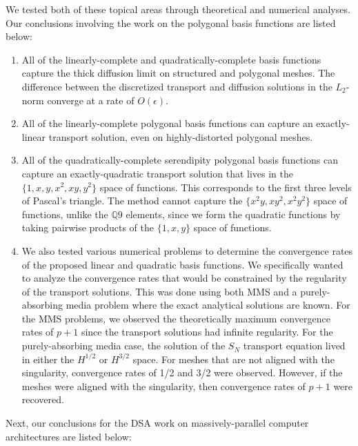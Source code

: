 We tested both of these topical areas through theoretical and numerical analyses. Our conclusions involving the work on the polygonal basis functions are listed below:

\begin{enumerate}
\item All of the linearly-complete and quadratically-complete basis functions capture the thick diffusion limit on structured and polygonal meshes. The difference between the discretized transport and diffusion solutions in the $L_2$-norm converge at a rate of $O(\epsilon)$.
\item All of the linearly-complete polygonal basis functions can capture an exactly-linear transport solution, even on highly-distorted polygonal meshes.
\item All of the quadratically-complete serendipity polygonal basis functions can capture an exactly-quadratic transport solution that lives in the $\{ 1,x,y,x^2,xy,y^2\}$ space of functions. This corresponds to the first three levels of Pascal's triangle. The method cannot capture the $\{ x^2y,xy^2,x^2y^2\}$ space of functions, unlike the $\mathbb{Q}9$ elements, since we form the quadratic functions by taking pairwise products of the $\{ 1,x,y\}$ space of functions.
\item We also tested various numerical problems to determine the convergence rates of the proposed linear and quadratic basis functions. We specifically wanted to analyze the convergence rates that would be constrained by the regularity of the transport solutions. This was done using both MMS and a purely-absorbing media problem where the exact analytical solutions are known. For the MMS problems, we observed the theoretically maximum convergence rates of $p+1$ since the transport solutions had infinite regularity. For the purely-absorbing media case, the solution of the $S_N$ transport equation lived in either the $H^{1/2}$ or $H^{3/2}$ space. For meshes that are not aligned with the singularity, convergence rates of 1/2 and 3/2 were observed. However, if the meshes were aligned with the singularity, then convergence rates of $p+1$ were recovered.
\end{enumerate}

Next, our conclusions for the DSA work on massively-parallel computer architectures are listed below:

